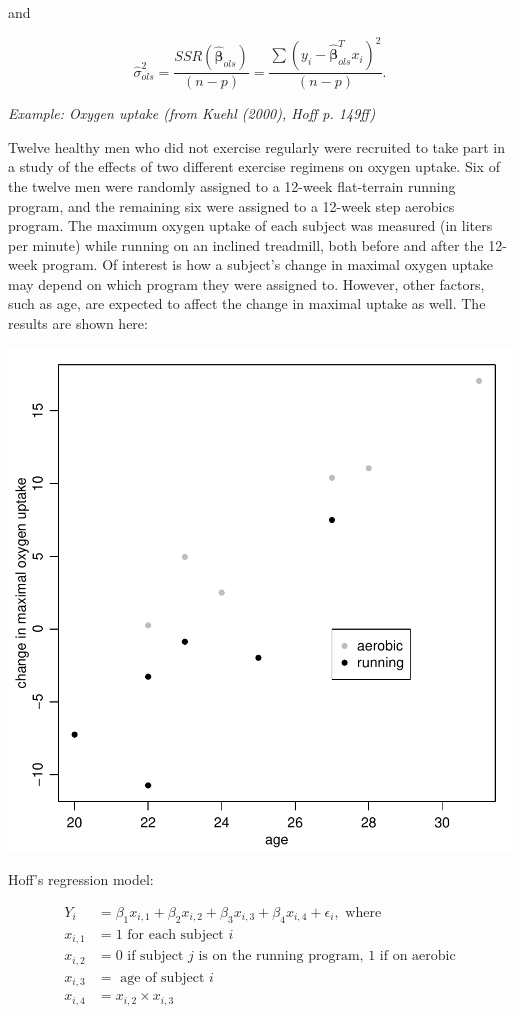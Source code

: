 \documentclass[12pt, a4paper]{article}
\begin{document}
and

$$\hat{\sigma}^2_{ols} = \frac{SSR\left(\hat{\boldsymbol\beta}_{ols}\right)}{(n-p)} = \frac{\sum\left(y_i - \hat{\boldsymbol\beta}_{ols}^T x_i\right)^2}{(n-p)}.$$

\clearpage

\textit{Example:  Oxygen uptake (from Kuehl (2000), Hoff p. 149ff)}

Twelve healthy men who did not exercise regularly were recruited to take part in a study of the effects of two different exercise regimens on oxygen uptake.  Six of the twelve men were randomly assigned to a 12-week flat-terrain running program, and the remaining six were assigned to a 12-week step aerobics program.  The maximum oxygen uptake of each subject was measured (in liters per minute) while running on an inclined treadmill, both before and after the 12-week program.  Of interest is how a subject's change in maximal oxygen uptake may depend on which program they were assigned to.  However, other factors, such as age, are expected to affect the change in maximal uptake as well.  The results are shown here:

\includegraphics{Thesis-011}

Hoff's regression model:

    \begin{align}
        Y_i &= \beta_1x_{i,1} + \beta_2x_{i,2} + \beta_3x_{i,3} + \beta_4x_{i,4} + \epsilon_i, \text{ where} \label{example_model}\\
        x_{i,1} &= 1 \text{ for each subject } i \nonumber \\
        x_{i,2} &= 0 \text{ if subject } j \text{ is on the running program, } 1 \text{ if on aerobic} \nonumber \\
        x_{i,3} &= \text{ age of subject } i \nonumber \\
        x_{i,4} &= x_{i,2} \times x_{i,3} \nonumber
    \end{align}
\end{document}
